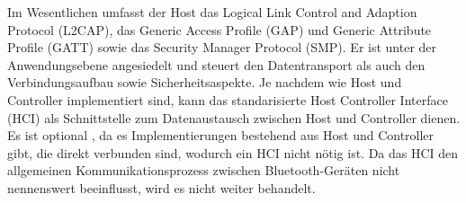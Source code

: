 Im Wesentlichen umfasst der Host das Logical Link Control and Adaption Protocol (L2CAP), das Generic Access Profile (GAP) und Generic Attribute Profile (GATT) sowie das Security Manager Protocol (SMP). Er ist unter der Anwendungsebene angesiedelt und steuert den Datentransport als auch den Verbindungsaufbau sowie Sicherheitsaspekte. Je nachdem wie Host und Controller implementiert sind, kann das standarisierte Host Controller Interface (HCI) als Schnittstelle zum Datenaustausch zwischen Host und Controller dienen. Es ist optional \cite{BtSpec4.0_138}, da es Implementierungen bestehend aus Host und Controller gibt, die direkt verbunden sind, wodurch ein HCI nicht nötig ist. Da das HCI den allgemeinen Kommunikationsprozess zwischen Bluetooth-Geräten nicht nennenswert beeinflusst, wird es nicht weiter behandelt.